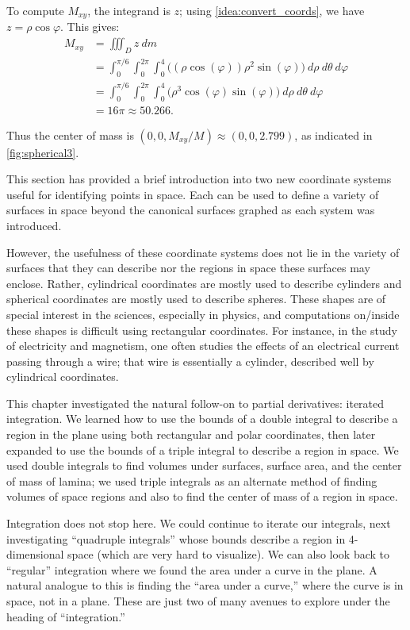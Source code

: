 {To compute $M_{xy}$, the integrand is $z$; using \autoref{idea:convert_coords}, we have $z = \rho\cos\varphi$. This gives:
\begin{align*}
M_{xy} &= \iiint_D z\ dm \\
	&= \int_0^{\pi/6}\int_0^{2\pi}\int_0^4 \big((\rho\cos(\varphi))\rho^2\sin(\varphi)\big) \ d\rho\ d\theta\ d\varphi\\
	&= \int_0^{\pi/6}\int_0^{2\pi}\int_0^4 \big(\rho^3\cos(\varphi)\sin(\varphi)\big) \ d\rho\ d\theta\ d\varphi\\
	&=16\pi \approx 50.266.
\end{align*}

Thus the center of mass is $(0,0,M_{xy}/M) \approx (0,0,2.799)$, as indicated in \autoref{fig:spherical3}.}



This section has provided a brief introduction into two new coordinate systems useful for identifying points in space. Each can be used to define a variety of surfaces in space beyond the canonical surfaces graphed as each system was introduced.

However, the usefulness of these coordinate systems does not lie in the variety of surfaces that they can describe nor the regions in space these surfaces may enclose. Rather,  cylindrical coordinates are mostly used to describe cylinders and spherical coordinates are mostly used to describe spheres. These shapes are of special interest in the sciences, especially in physics, and computations on/inside these shapes is difficult using rectangular coordinates. For instance, in the study of electricity and magnetism, one often studies the effects of an electrical current passing through a wire; that wire is essentially a cylinder, described well by cylindrical coordinates.\bigskip

This chapter investigated the natural follow-on to partial derivatives: iterated integration. We learned how to use the bounds of a double integral to describe a region in the plane using both rectangular and polar coordinates, then later expanded to use the bounds of a triple integral to describe a region in space. We used double integrals to find volumes under surfaces, surface area, and the center of mass of lamina; we used triple integrals as an alternate method of finding volumes of space regions and also to find the center of mass of a region in space.

Integration does not stop here. We could continue to iterate our integrals, next investigating ``quadruple integrals'' whose bounds describe a region in 4-dimensional space (which are very hard to visualize). We can also look back to ``regular'' integration where we found the area under a curve in the plane. A natural analogue to this is finding the ``area under a curve,'' where the curve is in space, not in a plane. These are just two of many avenues to explore under the heading of ``integration.''

